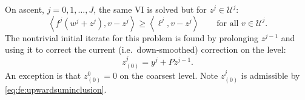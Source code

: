 \documentclass[review,hidelinks,onefignum,onetabnum]{siamart220329}
\newcommand{\cK}{\mathcal{K}}
\newcommand{\cV}{\mathcal{V}}
\newcommand{\ip}[2]{\left<#1,#2\right>}
\newcommand{\iR}{R^{\bullet}}
\begin{document}
On ascent, $j=0,1,\dots,J$, the same VI is solved but for $z^j \in \mathcal{U}^j$:
\begin{equation}
\ip{f^j(w^j + z^j)}{v-z^j} \ge \ip{\ell^j}{v-z^j} \qquad \text{for all } v\in \mathcal{U}^j. \label{eq:fe:upvi}
\end{equation}
The nontrivial initial iterate for this problem is found by prolonging $z^{j-1}$ and using it to correct the current (i.e.~down-smoothed) correction on the level:
\begin{equation}
z_{(0)}^j = y^j + P z^{j-1}.  \label{eq:fe:upwardinitial}
\end{equation}
An exception is that $z_{(0)}^0=0$ on the coarsest level.  Note $z_{(0)}^j$ is admissible by \eqref{eq:fe:upwardsuminclusion}.

\end{document}

